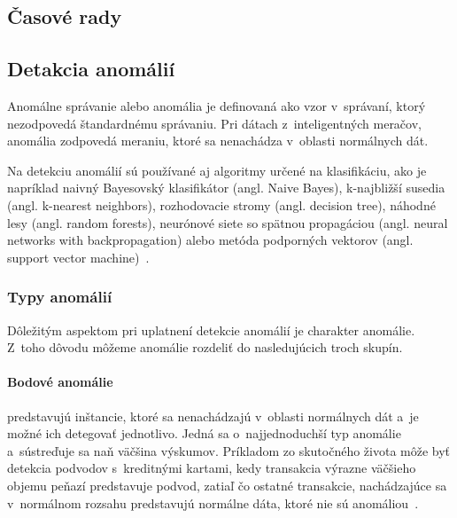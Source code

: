 \documentclass[a4paper,twoside,slovak,12pt]{article}
\begin{document}

\subsection{Časové rady}


\subsection{Detakcia anomálií}
Anomálne správanie alebo anomália je definovaná ako vzor v~správaní, ktorý
nezodpovedá štandardnému správaniu. Pri dátach z~inteligentných meračov,
anomália zodpovedá meraniu, ktoré sa nenachádza v~oblasti normálnych dát.

Na detekciu anomálií sú používané aj algoritmy určené na klasifikáciu, ako je
napríklad naivný Bayesovský klasifikátor (angl. Naive Bayes), k-najbližší
susedia (angl. k-nearest neighbors), rozhodovacie stromy (angl. decision tree),
náhodné lesy (angl. random forests), neurónové siete so spätnou propagáciou
(angl. neural networks with backpropagation) alebo metóda podporných vektorov
(angl. support vector machine)~\cite{Coma-Puig2016}.

\subsubsection{Typy anomálií}
Dôležitým aspektom pri uplatnení detekcie anomálií je charakter anomálie. Z~toho
dôvodu môžeme anomálie rozdeliť do nasledujúcich troch skupín.

\paragraph{Bodové anomálie} predstavujú inštancie, ktoré sa nenachádzajú
v~oblasti normálnych dát a~je možné ich detegovať jednotlivo. Jedná sa
o~najjednoduchší typ anomálie a~sústreďuje sa naň väčšina výskumov. Príkladom zo
skutočného života môže byť detekcia podvodov s~kreditnými kartami, kedy
transakcia výrazne väčšieho objemu peňazí predstavuje podvod, zatiaľ čo ostatné
transakcie, nachádzajúce sa v~normálnom rozsahu predstavujú normálne dáta, ktoré
nie sú anomáliou~\cite{Chandola2009}.
\end{document}
